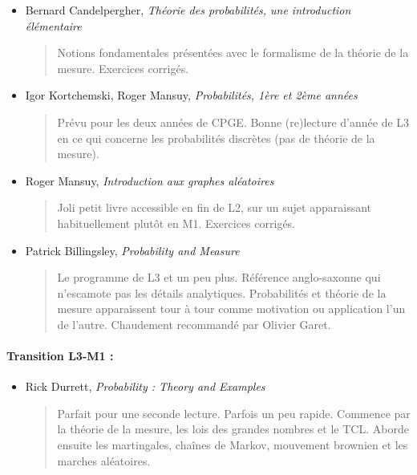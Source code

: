 \documentclass{article}
\begin{document}
\begin{itemize}
\item Bernard Candelpergher, \emph{Théorie des probabilités, une introduction élémentaire}
\begin{quote}
Notions fondamentales présentées avec le formalisme de la théorie de la mesure. Exercices corrigés.
\end{quote}
\item Igor Kortchemski, Roger Mansuy, \emph{Probabilités, 1ère et 2ème années}
\begin{quote}
Prévu pour les deux années de CPGE. Bonne (re)lecture d'année de L3 en ce qui concerne les probabilités discrètes (pas de théorie de la mesure).
\end{quote}
\item Roger Mansuy, \emph{Introduction aux graphes aléatoires}
\begin{quote}
Joli petit livre accessible en fin de L2, sur un sujet apparaissant habituellement plutôt en M1. Exercices corrigés.
\end{quote}
\item Patrick Billingsley, \emph{Probability and Measure}
\begin{quote}
Le programme de L3 et un peu plus. Référence anglo-saxonne qui n'escamote pas les détails analytiques. Probabilités et théorie de la mesure apparaissent tour à tour comme motivation ou application l'un de l'autre. Chaudement recommandé par Olivier Garet.
\end{quote}

\end{itemize}
\paragraph{Transition L3-M1 : }
\begin{itemize}
\item Rick Durrett, \emph{Probability : Theory and Examples}
\begin{quote}
Parfait pour une seconde lecture. Parfois un peu rapide.  Commence par la théorie de la mesure, les lois des grandes nombres et le TCL. Aborde ensuite les martingales, chaînes de Markov, mouvement brownien et les marches aléatoires.
\end{quote}
\end{itemize}
\end{document}
